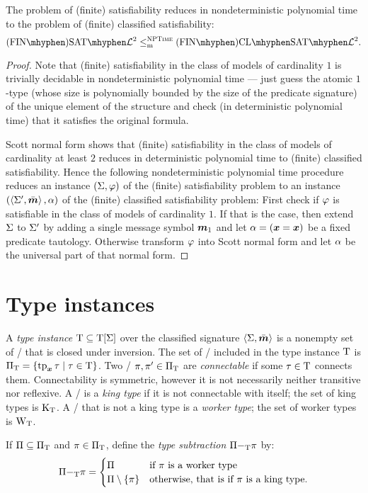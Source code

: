 \begin{remark}
The problem of (finite) satisfiability reduces in nondeterministic polynomial
time to the problem of (finite) classified satisfiability:
\[
  \FinASat{\vFo2} \red\cNP \FinAClSat{\vFo2}.
\]
\end{remark}
\begin{proof}

Note that (finite) satisfiability in the class of models of cardinality $1$ is
trivially decidable in nondeterministic polynomial time --- just guess the
atomic $1$-type (whose size is polynomially bounded by the size of the
predicate signature) of the unique element of the structure and check (in
deterministic polynomial time) that it satisfies the original formula.

Scott normal form shows that (finite) satisfiability in the class of models of
cardinality at least $2$ reduces in deterministic polynomial time to (finite)
classified satisfiability.
Hence the following nondeterministic polynomial time procedure reduces an
instance $(\mathrm{\Sigma}, \varphi)$ of the (finite) satisfiability problem to an instance
$(\left\langle \mathrm{\Sigma'},\bar{\bm{m}} \right\rangle, \alpha)$ of the (finite) classified satisfiability problem:
First check if $\varphi$ is satisfiable in the class of models of cardinality $1$.
If that is the case, then extend $\mathrm{\Sigma}$ to $\mathrm{\Sigma'}$ by adding a single message
symbol $\bm{m}_{1}$ and let $\alpha = (\bm{x} = \bm{x})$ be a fixed predicate tautology.
Otherwise transform $\varphi$ into Scott normal form and let $\alpha$ be the
universal part of that normal form.
\end{proof}

\section{Type instances}
A \emph{type instance} $\mathrm{T} \subseteq \mathrm{T}[\mathrm{\Sigma}]$ over the classified signature
$\left\langle \mathrm{\Sigma},\bar{\bm{m}} \right\rangle$ is a nonempty set of \twotypes/ that is closed under
inversion.
The set of \onetypes/ included in the type instance $\mathrm{T}$ is
${\Pi}_{\mathrm{T}} = \left\{\operatorname{tp}_{\bm{x}}\tau\mathrel{}\middle|\mathrel{}\tau\in\mathrm{T}\right\}$.
Two \onetypes/ $\pi,{\pi'} \in {\Pi}_{\mathrm{T}}$ are \emph{connectable} if some
$\tau\in\mathrm{T}$ connects them.
Connectability is symmetric, however it is not necessarily neither transitive
nor reflexive.
A \onetype/ is a \emph{king type} if it is not connectable with itself;
the set of king types is ${\mathrm{K}}_{\mathrm{T}}$.
A \onetype/ that is not a king type is a \emph{worker type};
the set of worker types is ${\mathrm{W}}_{\mathrm{T}}$.

If $\Pi \subseteq {\Pi}_{\mathrm{T}}$ and $\pi \in {\Pi}_{\mathrm{T}}$, define the
\emph{type subtraction} $\Pi {-}_{\mathrm{T}} \pi$ by:
\[
  \Pi {-}_{\mathrm{T}} \pi = \begin{cases}
    \Pi &\text{if } \pi \text{ is a worker type} \\
    \Pi \setminus \left\{\pi\right\} &\text{otherwise, that is if } \pi \text{ is a king
    type.}
  \end{cases}
\]


